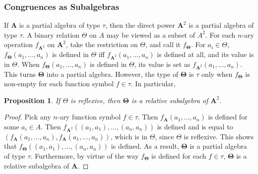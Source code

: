 \documentclass[12pt]{article}
\newtheorem{prop}{Proposition}
\begin{document}
\subsubsection*{Congruences as Subalgebras}

If $\boldsymbol{A}$ is a partial algebra of type $\tau$, then the direct power $\boldsymbol{A}^2$ is a partial algebra of type $\tau$.  A binary relation $\Theta$ on $A$ may be viewed as a subset of $A^2$.  For each $n$-ary operation $f_{\boldsymbol{A}^2}$ on $\boldsymbol{A}^2$, take the restriction on $\Theta$, and call it $f_{\boldsymbol{\Theta}}$.  For $a_i\in \Theta$, $f_{\boldsymbol{\Theta}}(a_1,\ldots, a_n)$ is defined in $\Theta$ iff $f_{\boldsymbol{A}^2}(a_1,\ldots, a_n)$ is defined at all, and its value is in $\Theta$.  When $f_{\boldsymbol{\Theta}}(a_1,\ldots, a_n)$ is defined in $\Theta$, its value is set as $f_{\boldsymbol{A}^2}(a_1,\ldots, a_n)$.  This turns $\boldsymbol{\Theta}$ into a partial algebra.  However, the type of $\boldsymbol{\Theta}$ is $\tau$ only when $f_{\boldsymbol{\Theta}}$ is non-empty for each function symbol $f\in \tau$.  In particular, 

\begin{prop} If $\Theta$ is reflexive, then $\boldsymbol{\Theta}$ is a relative subalgebra of $\boldsymbol{A}^2$. \end{prop}
\begin{proof}  Pick any $n$-ary function symbol $f\in \tau$.  Then $f_{\boldsymbol{A}}(a_1,\ldots, a_n)$ is defined for some $a_i \in A$.  Then $f_{\boldsymbol{A}^2}((a_1,a_1), \ldots, (a_n,a_n))$ is defined and is equal to $(f_{\boldsymbol{A}}(a_1, \ldots, a_n),f_{\boldsymbol{A}}(a_1, \ldots, a_n))$, which is in $\Theta$, since $\Theta$ is reflexive.  This shows that $f_{\boldsymbol{\Theta}}((a_1,a_1), \ldots, (a_n,a_n))$ is defined.  As a result, $\boldsymbol{\Theta}$ is a partial algebra of type $\tau$.  Furthermore, by virtue of the way $f_{\boldsymbol{\Theta}}$ is defined for each $f\in \tau$, $\boldsymbol{\Theta}$ is a relative subalgebra of $\boldsymbol{A}$.
\end{proof}
\end{document}
